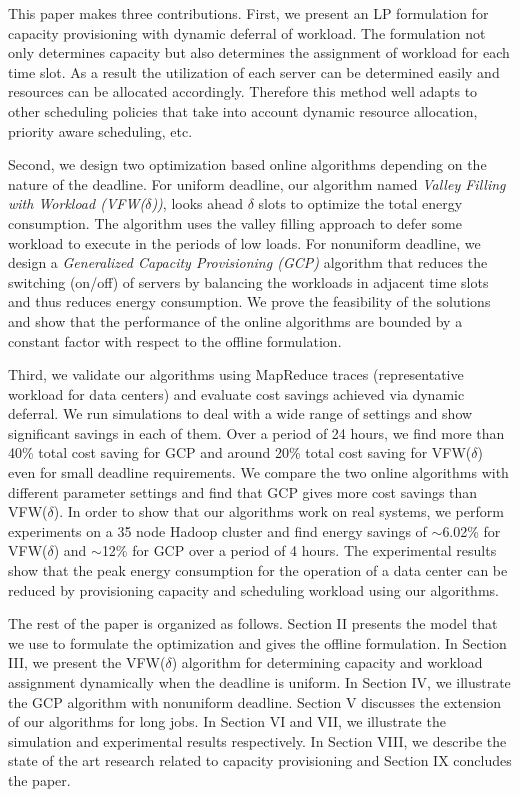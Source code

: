 \documentclass[10pt,conference,compsocconf,letterpaper]{IEEEtran}
\begin{document}
This paper makes three contributions. First, we present an LP formulation for capacity provisioning with dynamic deferral of workload. The formulation not only determines capacity but also determines the assignment of workload for each time slot. As a result the utilization of each server can be determined easily and resources can be allocated accordingly. Therefore this method well adapts to other scheduling policies that take into account dynamic resource allocation, priority aware scheduling, etc.

Second, we design two optimization based online algorithms depending on the nature of the deadline. For uniform deadline, our algorithm named {\it Valley Filling with Workload (VFW($\delta$))}, looks ahead $\delta$ slots to optimize the total energy consumption. The algorithm uses the valley filling approach to defer some workload to execute in the periods of low loads. For nonuniform deadline, we design a {\it Generalized Capacity Provisioning (GCP)} algorithm that reduces the switching (on/off) of servers by balancing the workloads in adjacent time slots and thus reduces energy consumption.  We prove the feasibility of the solutions and show that the performance of the online algorithms are bounded by a constant factor with respect to the offline formulation.

Third, we validate our algorithms using MapReduce traces (representative workload for data centers) and evaluate cost savings achieved via dynamic deferral. We run simulations to deal with a wide range of settings and show significant savings in each of them. Over a period of 24 hours, we find more than 40\% total cost saving for GCP and around 20\% total cost saving for VFW($\delta$) even for small deadline requirements. We compare the two online algorithms with different parameter settings and find that GCP gives more cost savings than VFW($\delta$). In order to show that our algorithms work on real systems, we perform experiments on a 35 node Hadoop cluster and find energy savings of $\sim$6.02\% for VFW($\delta$) and $\sim$12\% for GCP over a period of 4 hours. The experimental results show that the peak energy consumption for the operation of a data center can be reduced by provisioning capacity and scheduling workload using our algorithms.








The rest of the paper is organized as follows. Section II presents the model that we use to formulate the optimization and gives the offline formulation. In Section III, we present the VFW($\delta$) algorithm for determining capacity and workload assignment dynamically when the deadline is uniform. In Section IV, we illustrate the GCP algorithm with nonuniform deadline. Section V discusses the extension of our algorithms for long jobs. In Section VI and VII, we illustrate the simulation and experimental results respectively. In Section VIII, we describe the state of the art research related to capacity provisioning and Section IX concludes the paper.
\end{document}
